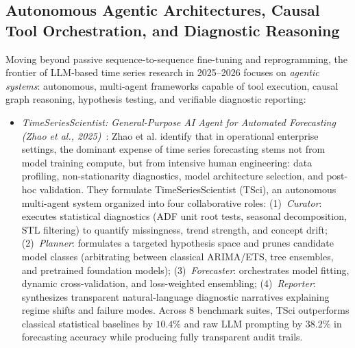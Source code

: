 \subsection{Autonomous Agentic Architectures, Causal Tool Orchestration, and Diagnostic Reasoning}
\label{sec:agentic_causal_orchestration}

Moving beyond passive sequence-to-sequence fine-tuning and reprogramming, the frontier of LLM-based time series research in 2025--2026 focuses on \emph{agentic systems}: autonomous, multi-agent frameworks capable of tool execution, causal graph reasoning, hypothesis testing, and verifiable diagnostic reporting:

\begin{itemize}[leftmargin=*]
    \item \emph{TimeSeriesScientist: General-Purpose AI Agent for Automated Forecasting (Zhao et al., 2025)}~\cite{zhao2025timeseriesscientist}: Zhao et al. identify that in operational enterprise settings, the dominant expense of time series forecasting stems not from model training compute, but from intensive human engineering: data profiling, non-stationarity diagnostics, model architecture selection, and post-hoc validation. They formulate TimeSeriesScientist (TSci), an autonomous multi-agent system organized into four collaborative roles:
    (1)~\emph{Curator}: executes statistical diagnostics (ADF unit root tests, seasonal decomposition, STL filtering) to quantify missingness, trend strength, and concept drift;
    (2)~\emph{Planner}: formulates a targeted hypothesis space and prunes candidate model classes (arbitrating between classical ARIMA/ETS, tree ensembles, and pretrained foundation models);
    (3)~\emph{Forecaster}: orchestrates model fitting, dynamic cross-validation, and loss-weighted ensembling;
    (4)~\emph{Reporter}: synthesizes transparent natural-language diagnostic narratives explaining regime shifts and failure modes. Across 8 benchmark suites, TSci outperforms classical statistical baselines by $10.4\%$ and raw LLM prompting by $38.2\%$ in forecasting accuracy while producing fully transparent audit trails.


\end{itemize}
